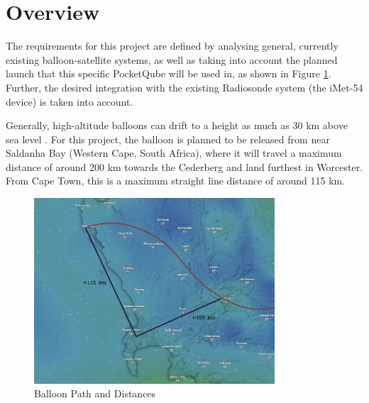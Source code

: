\graphicspath{{./figures/}}

\section{Overview}

The requirements for this project are defined by analysing general, currently existing balloon-satellite systems, as well as taking into account the planned launch that this specific \mbox{PocketQube} will be used in, as shown in Figure \ref{fig:balloon_path}. Further, the desired integration with the existing Radiosonde system (the iMet-54 device) is taken into account.

Generally, high-altitude balloons can drift to a height as much as 30 km above sea level \cite{site-weatherWeatherBalloons}. For this project, the balloon is planned to be released from near Saldanha Bay (Western Cape, South Africa), where it will travel a maximum distance of around 200 km towards the Cederberg and land furthest in Worcester. From Cape Town, this is a maximum straight line distance of around 115 km. 

\begin{figure}[!htb]
  \centering
  \includegraphics[width=0.8\textwidth]{balloon_path}
  \caption{Balloon Path and Distances}
  \label{fig:balloon_path}
\end{figure}